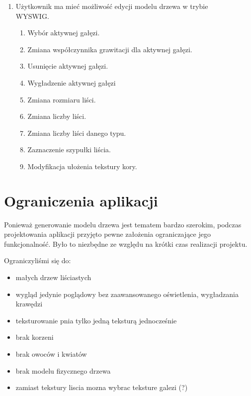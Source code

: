 \begin{enumerate}
\item Użytkownik ma mieć możliwość edycji modelu drzewa w trybie \\WYSWIG.
\begin{enumerate}
\item Wybór aktywnej gałęzi.
\item Zmiana współczynnika grawitacji dla aktywnej gałęzi.
\item Usunięcie aktywnej gałęzi.
\item Wygładzenie aktywnej gałęzi
\item Zmiana rozmiaru liści.
\item Zmiana liczby liści.
\item Zmiana liczby liści danego typu.
\item Zaznaczenie szypułki liścia.
\item Modyfikacja ułożenia tekstury kory.
\end{enumerate}
\end{enumerate}

\section{Ograniczenia aplikacji}
Ponieważ generowanie modelu drzewa jest tematem bardzo szerokim, podczas projektowania
aplikacji przyjęto pewne założenia ograniczające jego funkcjonalność. Było to niezbędne ze
względu na krótki czas realizacji projektu.

Ograniczyliśmi się do:
\begin{itemize}
	\item {małych drzew liściastych}
	\item {wygląd jedynie poglądowy bez zaawansowanego oświetlenia, wygładzania krawędzi}
	\item {teksturowanie pnia tylko jedną teksturą jednocześnie}
	\item {brak korzeni}
	\item {brak owoców i kwiatów}
	\item {brak modelu fizycznego drzewa}
	\item {zamiast tekstury liscia mozna wybrac teksture galezi (?)}
\end{itemize}
